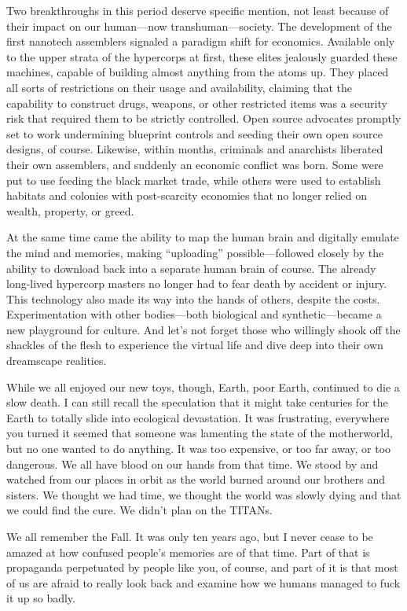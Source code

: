 Two breakthroughs in this period deserve specific mention, not least
because of their impact on our human—now transhuman—society. The
development of the first nanotech assemblers signaled a paradigm shift
for economics. Available only to the upper strata of the hypercorps at
first, these elites jealously guarded these machines, capable of
building almost anything from the atoms up. They placed all sorts of
restrictions on their usage and availability, claiming that the
capability to construct drugs, weapons, or other restricted items was
a security risk that required them to be strictly controlled. Open
source advocates promptly set to work undermining blueprint controls
and seeding their own open source designs, of course.  Likewise,
within months, criminals and anarchists liberated their own
assemblers, and suddenly an economic conflict was born. Some were put
to use feeding the black market trade, while others were used to
establish habitats and colonies with post-scarcity economies that no
longer relied on wealth, property, or greed.

At the same time came the ability to map the human brain and digitally
emulate the mind and memories, making “uploading” possible—followed
closely by the ability to download back into a separate human brain of
course. The already long-lived hypercorp masters no longer had to fear
death by accident or injury. This technology also made its way into
the hands of others, despite the costs. Experimentation with other
bodies—both biological and synthetic—became a new playground for
culture.  And let's not forget those who willingly shook off the
shackles of the flesh to experience the virtual life and dive deep
into their own dreamscape realities.

While we all enjoyed our new toys, though, Earth, poor Earth,
continued to die a slow death. I can still recall the speculation that
it might take centuries for the Earth to totally slide into ecological
devastation. It was frustrating, everywhere you turned it seemed that
someone was lamenting the state of the motherworld, but no one wanted
to do anything. It was too expensive, or too far away, or too
dangerous. We all have blood on our hands from that time. We stood by
and watched from our places in orbit as the world burned around our
brothers and sisters. We thought we had time, we thought the world was
slowly dying and that we could find the cure. We didn't plan on the
TITANs.

We all remember the Fall. It was only ten years ago, but I never cease
to be amazed at how confused people's memories are of that time. Part
of that is propaganda perpetuated by people like you, of course, and
part of it is that most of us are afraid to really look back and
examine how we humans managed to fuck it up so badly.

